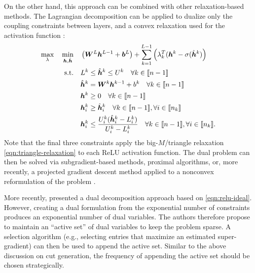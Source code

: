 On the other hand, this approach can be combined with other relaxation-based methods. 
The Lagrangian decomposition can be applied to dualize only the coupling constraints between layers, and a convex relaxation used for the activation function \citep{bunel2020lagrangian}: 
\begin{align*}
    \max_\lambda \quad \min_{{\bm{h}},\hat{{\bm{h}}}} \quad& \left( {\bm{W}}^L {{\bm{h}}}^{L-1} + {\bm{b}}^L \right) + \sum_{k=1}^{L-1} \left( \lambda_k^T({\bm{h}}^k - \sigma(\hat{{\bm{h}}}^k) \right) \\
    \text{s.t.} \quad
    & L^k \leq \hat{{\bm{h}}}^k \leq U^k \quad \forall k \in \llbracket n - 1 \rrbracket \\
    & \hat{{\bm{h}}}^{k} = {\bm{W}}^{k} {\bm{h}}^{k-1} + b^k \quad \forall k \in \llbracket n - 1 \rrbracket \\
    & {\bm{h}}^k \geq 0 \quad \forall k \in \llbracket n - 1 \rrbracket \\
    & {\bm{h}}_i^k \geq \hat{{\bm{h}}}_i^k \quad \forall k \in \llbracket n - 1 \rrbracket, \forall i \in \llbracket n_k \rrbracket \\
    & {\bm{h}}^k_i \leq \frac{U^k_i(\hat{{\bm{h}}}^k_i - L^k_i)}{U^k_i - L^k_i} \quad \forall k \in \llbracket n - 1 \rrbracket, \forall i \in \llbracket n_k \rrbracket.
\end{align*}
Note that the final three constraints apply the big-$M$/triangle relaxation \eqref{eqn:triangle-relaxation} to each ReLU activation function. 
The dual problem can then be solved via subgradient-based methods, proximal algorithms, or, more recently, a projected gradient descent method applied to a nonconvex reformulation of the problem \citep{bunel2020efficient}.

More recently, \cite{depalma2021scaling} presented a dual decomposition approach based on \eqref{eqn:relu-ideal}. 
However, creating a dual formulation from the exponential number of constraints produces an exponential number of dual variables. The authors therefore propose to maintain an ``active set'' of dual variables to keep the problem sparse. A selection algorithm (e.g., selecting entries that maximize an estimated super-gradient) can then be used to append the active set. 
Similar to the above discussion on cut generation, the frequency of appending the active set should be chosen strategically. 



